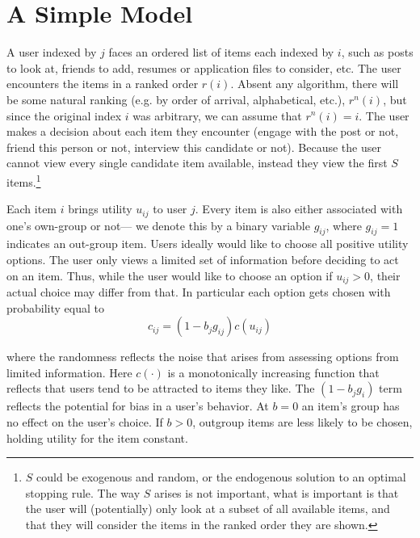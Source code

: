 \documentclass[12pt,letterpaper]{article}
\begin{document}
\section{A Simple Model}


A user indexed by $j$ faces an ordered list of items each indexed by $i$, such as posts to look at, friends to add, resumes or application files to consider, etc. The user encounters the items in a ranked order $r(i)$. Absent any algorithm, there will be some natural ranking (e.g. by order of arrival, alphabetical, etc.), $r^n(i)$, but since the original index $i$ was arbitrary, we can assume that $r^n(i) = i$. The user makes a decision about each item they encounter (engage with the post or not, friend this person or not, interview this candidate or not). Because the user cannot view every single candidate item available, instead they view the first $S$ items.\footnote{$S$ could be exogenous and random, or the endogenous solution to an optimal stopping rule. The way $S$ arises is not important, what is important is that the user will (potentially) only look at a subset of all available items, and that they will consider the items in the ranked order they are shown.}



Each item $i$ brings utility $u_{ij}$ to user $j$. Every item is also either associated with one's own-group or not--- we denote this by a binary variable $g_{ij}$, where $g_{ij}=1$ indicates an out-group item. Users ideally would like to choose all positive utility options. The user only views a limited set of information before deciding to act on an item. Thus, while the user would like to choose an option if $u_{ij} >0$, their actual choice may differ from that. In particular each option gets chosen with probability equal to 
$$c_{ij} = (1-b_jg_{ij})c(u_{ij})$$

where the randomness reflects the noise that arises from assessing options from limited information. Here $c(\cdot)$ is a monotonically increasing function that reflects that users tend to be attracted to items they like. The $(1-b_jg_{i})$ term reflects the potential for bias in a user's behavior. At $b=0$ an item's group has no effect on the user's choice. If $b >0$, outgroup items are less likely to be chosen, holding utility for the item constant. 
\end{document}
